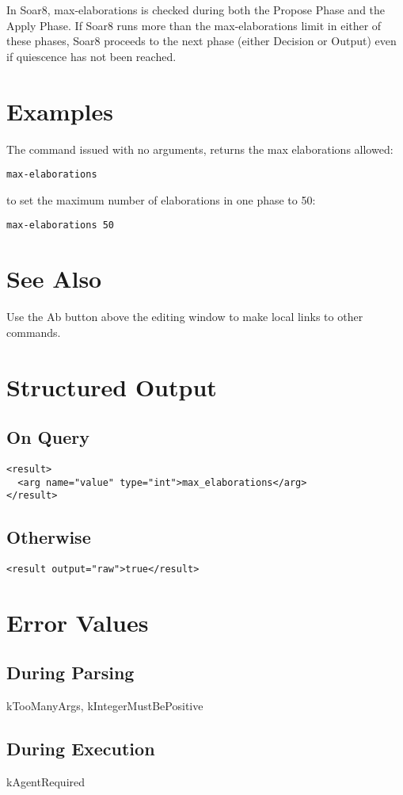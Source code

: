 \documentclass[10pt]{article}
\begin{document}
 In Soar8, max-elaborations is checked during both the Propose Phase and the Apply Phase. If Soar8 runs more than the max-elaborations limit in either of these phases, Soar8 proceeds to the next phase (either Decision or Output) even if quiescence has not been reached. 
\section*{ Examples }


 The command issued with no arguments, returns the max elaborations allowed: \begin{verbatim}
max-elaborations 

\end{verbatim}



 to set the maximum number of elaborations in one phase to 50: \begin{verbatim}
max-elaborations 50

\end{verbatim}

\section*{ See Also }


 Use the Ab button above the editing window to make local links to other commands. \\ 

\section*{ Structured Output }
\subsection*{ On Query }
\begin{verbatim}
<result>
  <arg name="value" type="int">max_elaborations</arg>
</result>

\end{verbatim}
\subsection*{ Otherwise }
\begin{verbatim}
<result output="raw">true</result>

\end{verbatim}
\section*{ Error Values }
\subsection*{ During Parsing }


 kTooManyArgs, kIntegerMustBePositive
\subsection*{ During Execution }


 kAgentRequired
\end{document}
